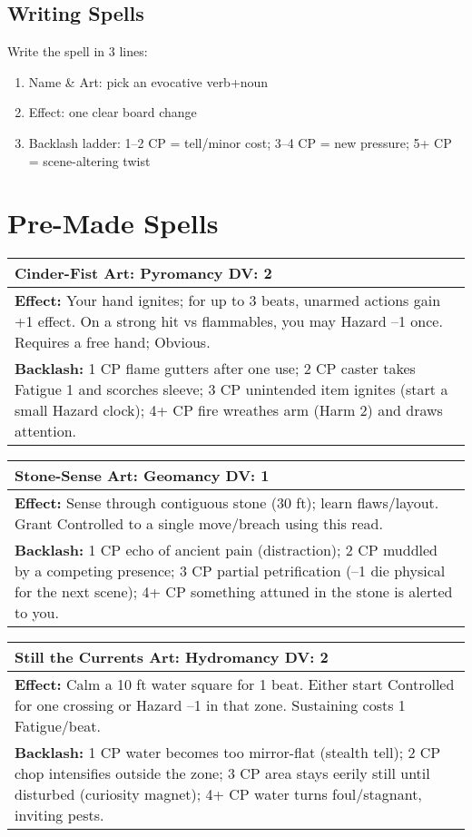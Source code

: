 \documentclass[11pt]{report}
\newenvironment{spellentry}[3]{%
  \begin{center}
    \begin{tabular}{|p{5.5in}|}
      \hline
      \textbf{#1} \hfill \textbf{Art:} #2 \hfill \textbf{DV:} #3 \\
      \hline
}{%
      \hline
    \end{tabular}
  \end{center}
}
\begin{document}
\subsection{Writing Spells}
Write the spell in 3 lines:
\begin{enumerate}
    \item Name \& Art: pick an evocative verb+noun
    \item Effect: one clear board change
    \item Backlash ladder: 1–2 CP = tell/minor cost; 3–4 CP = new pressure; 5+ CP = scene-altering twist
\end{enumerate}

\section{Pre-Made Spells}

\begin{spellentry}{Cinder-Fist}{Pyromancy}{2}
\textbf{Effect:} Your hand ignites; for up to 3 beats, unarmed actions gain +1 effect. On a strong hit vs flammables, you may Hazard –1 once. Requires a free hand; Obvious.\\
\textbf{Backlash:} 1 CP flame gutters after one use; 2 CP caster takes Fatigue 1 and scorches sleeve; 3 CP unintended item ignites (start a small Hazard clock); 4+ CP fire wreathes arm (Harm 2) and draws attention.
\end{spellentry}

\begin{spellentry}{Stone-Sense}{Geomancy}{1}
\textbf{Effect:} Sense through contiguous stone (30 ft); learn flaws/layout. Grant Controlled to a single move/breach using this read.\\
\textbf{Backlash:} 1 CP echo of ancient pain (distraction); 2 CP muddled by a competing presence; 3 CP partial petrification (–1 die physical for the next scene); 4+ CP something attuned in the stone is alerted to you.
\end{spellentry}

\begin{spellentry}{Still the Currents}{Hydromancy}{2}
\textbf{Effect:} Calm a 10 ft water square for 1 beat. Either start Controlled for one crossing or Hazard –1 in that zone. Sustaining costs 1 Fatigue/beat.\\
\textbf{Backlash:} 1 CP water becomes too mirror-flat (stealth tell); 2 CP chop intensifies outside the zone; 3 CP area stays eerily still until disturbed (curiosity magnet); 4+ CP water turns foul/stagnant, inviting pests.
\end{spellentry}
\end{document}

